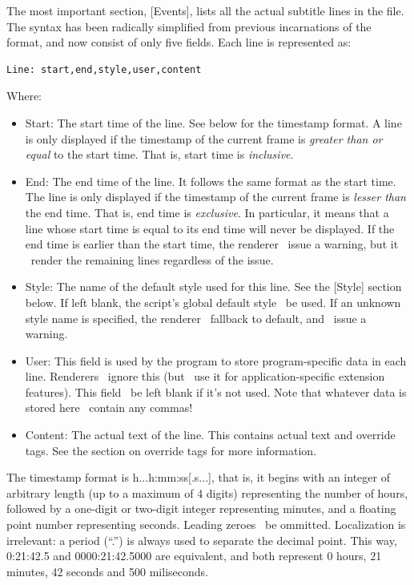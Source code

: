 \documentclass{spec}
\begin{document}
The most important section, [Events], lists all the actual subtitle lines in the file. The syntax has
been radically simplified from previous incarnations of the format, and now consist of only five fields.
Each line is represented as:

\begin{verbatim}
Line: start,end,style,user,content
\end{verbatim}

Where:

\begin{itemize}
\item Start: The start time of the line. See below for the timestamp format. A line is only displayed if
the timestamp of the current frame is \emph{greater than or equal} to the start time. That is, start
time is \emph{inclusive}.
\item End: The end time of the line. It follows the same format as the start time. The line is only
displayed if the timestamp of the current frame is \emph{lesser than} the end time. That is, end time is
\emph{exclusive}. In particular, it means that a line whose start time is equal to its end time will
never be displayed. If the end time is earlier than the start time, the renderer \may\ issue a warning,
but it \should\ render the remaining lines regardless of the issue.
\item Style: The name of the default style used for this line. See the [Style] section below. If left blank,
the script's global default style \must\ be used. If an unknown style name is specified, the renderer \must\
fallback to default, and \may\ issue a warning.
\item User: This field is used by the program to store program-specific data in each line. Renderers
\should\ ignore this (but \may\ use it for application-specific extension features). This field \should\
be left blank if it's not used. Note that whatever data is stored here \mustnot\ contain any commas!
\item Content: The actual text of the line. This contains actual text and override tags. See the section
on override tags for more information.
\end{itemize}

The timestamp format is h...h:mm:ss[.s...], that is, it begins with an integer of arbitrary length
(up to a maximum of 4 digits) representing the number of hours, followed by a one-digit or two-digit integer
representing minutes, and a floating point number representing seconds. Leading zeroes \may\ be ommitted.
Localization is irrelevant: a period (``.'') is always used to separate the decimal point. This way,
0:21:42.5 and 0000:21:42.5000 are equivalent, and both represent 0 hours, 21 minutes, 42 seconds and 500 miliseconds.
\end{document}
